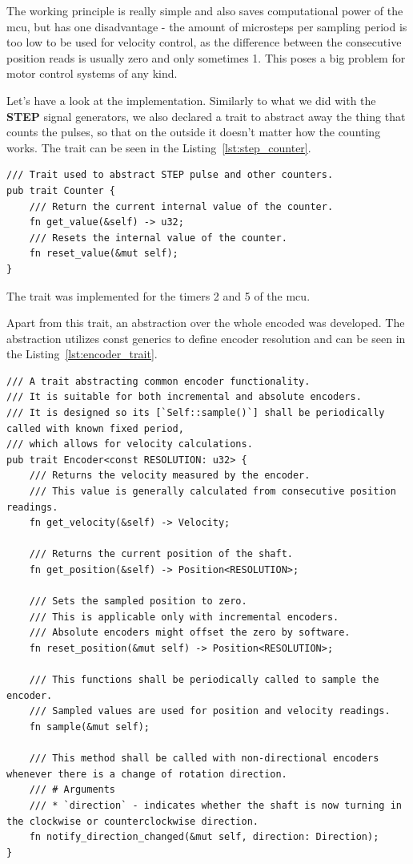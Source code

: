 The working principle is really simple and also saves computational power of the \acs{mcu}, but has one disadvantage - the amount of microsteps per sampling period is too low to be used for velocity control, as the difference between the consecutive position reads is usually zero and only sometimes 1.
This poses a big problem for motor control systems of any kind.

Let's have a look at the implementation.
Similarly to what we did with the \textbf{STEP} signal generators, we also declared a trait to abstract away the thing that counts the pulses, so that on the outside it doesn't matter how the counting works.
The trait can be seen in the Listing~\ref{lst:step_counter}.

\begin{lstlisting}[caption={Counter trait for counting STEP pulses.},label=lst:step_counter]
/// Trait used to abstract STEP pulse and other counters.
pub trait Counter {
    /// Return the current internal value of the counter.
    fn get_value(&self) -> u32;
    /// Resets the internal value of the counter.
    fn reset_value(&mut self);
}
\end{lstlisting}
The trait was implemented for the timers 2 and 5 of the \acs{mcu}.

Apart from this trait, an abstraction over the whole encoded was developed.
The abstraction utilizes const generics to define encoder resolution and can be seen in the Listing~\ref{lst:encoder_trait}.

\begin{lstlisting}[caption={Encoder trait for abstracting encoders.},label=lst:encoder_trait]
/// A trait abstracting common encoder functionality.
/// It is suitable for both incremental and absolute encoders.
/// It is designed so its [`Self::sample()`] shall be periodically called with known fixed period,
/// which allows for velocity calculations.
pub trait Encoder<const RESOLUTION: u32> {
    /// Returns the velocity measured by the encoder.
    /// This value is generally calculated from consecutive position readings.
    fn get_velocity(&self) -> Velocity;

    /// Returns the current position of the shaft.
    fn get_position(&self) -> Position<RESOLUTION>;

    /// Sets the sampled position to zero.
    /// This is applicable only with incremental encoders.
    /// Absolute encoders might offset the zero by software.
    fn reset_position(&mut self) -> Position<RESOLUTION>;

    /// This functions shall be periodically called to sample the encoder.
    /// Sampled values are used for position and velocity readings.
    fn sample(&mut self);

    /// This method shall be called with non-directional encoders whenever there is a change of rotation direction.
    /// # Arguments
    /// * `direction` - indicates whether the shaft is now turning in the clockwise or counterclockwise direction.
    fn notify_direction_changed(&mut self, direction: Direction);
}
\end{lstlisting}

